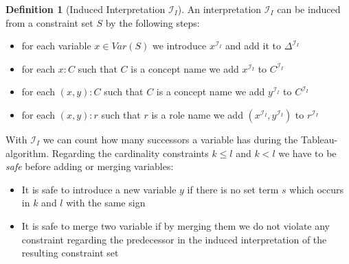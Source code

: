 \documentclass[a4paper,11pt]{scrartcl}
\theoremstyle{break}
\theoremstyle{definition}
\newtheorem{mydef}{Definition}
\begin{document}
\begin{mydef}[Induced Interpretation $\mathcal{I}_I$]
An interpretation $\mathcal{I}_I$ can be induced from a constraint set $S$ by the following steps:
\begin{itemize}
\item for each variable $x\in Var(S)$ we introduce $x^{\mathcal{I}_I}$ and add it to $\Delta^{\mathcal{I}_I}$
\item for each $x:C$ such that $C$ is a concept name we add $x^{\mathcal{I}_I}$ to $C^{\mathcal{I}_I}$
\item for each $(x,y):C$ such that $C$ is a concept name we add $y^{\mathcal{I}_I}$ to $C^{\mathcal{I}_I}$
\item for each $(x,y):r$ such that $r$ is a role name we add $(x^{\mathcal{I}_I},y^{\mathcal{I}_I})$ to $r^{\mathcal{I}_I}$
\end{itemize}
With $\mathcal{I}_I$ we can count how many successors a variable has during the Tableau-algorithm. Regarding the cardinality constraints $k\leq l$ and $k<l$ we have to be \textit{safe} before adding or merging variables:
\begin{itemize}
\item It is safe to introduce a new variable $y$ if there is no set term $s$ which occurs in $k$ and $l$ with the same sign
\item It is safe to merge two variable if by merging them we do not violate any constraint regarding the predecessor in the induced interpretation of the resulting constraint set
\end{itemize}
\end{mydef}
\end{document}
